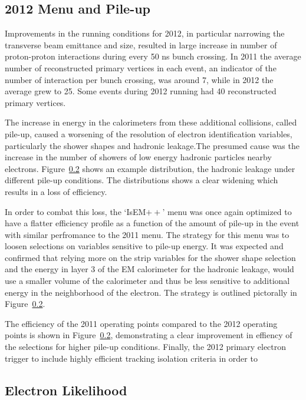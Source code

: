 \subsection{2012 Menu and Pile-up}

Improvements in the running conditions for 2012, in particular narrowing the transverse beam emittance and size, resulted in large increase in number of proton-proton interactions during every 50 ns bunch crossing. In 2011 the average number of reconstructed primary vertices in each event, an indicator of the number of interaction per bunch crossing, was around 7, while in 2012 the average grew to 25. Some events during 2012 running had 40 reconstructed primary vertices.

The increase in energy in the calorimeters from these additional collisions, called pile-up, caused a worsening of the resolution of electron identification variables, particularly the shower shapes and hadronic leakage.The presumed cause was the increase in the number of showers of low energy hadronic particles nearby electrons.  Figure~\ref{} shows an example distribution, the hadronic leakage under different pile-up conditions. The distributions shows a clear widening which results in a loss of efficiency. 

In order to combat this loss, the `IsEM$++$' menu was once again optimized to have a flatter efficiency profile as a function of the amount of pile-up in the event with similar perfromance to the 2011 menu. The strategy for this menu was to loosen selections on variables sensitive to pile-up energy. It was expected and confirmed that relying more on the strip variables for the shower shape selection and the energy in layer 3 of the EM calorimeter for the hadronic leakage, would use a smaller volume of the calorimeter and thus be less sensitive to additional energy in the neighborhood of the electron. The strategy is outlined pictorally in Figure~\ref{}.  

The efficiency of the 2011 operating points compared to the 2012 operating points is shown in Figure~\ref{}, demonstrating a clear improvement in effiency of the selections for higher pile-up conditions. Finally, the 2012 primary electron trigger to include highly efficient tracking isolation criteria in order to 

\subsection{Electron Likelihood}

